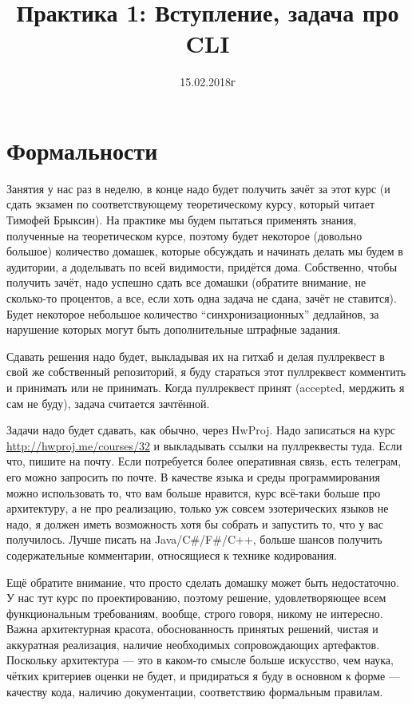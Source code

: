 \documentclass[a5paper]{article}
\title{Практика 1: Вступление, задача про CLI}
\date{15.02.2018г}
\begin{document}
\maketitle
\thispagestyle{empty}

\section{Формальности}
Занятия у нас раз в неделю, в конце надо будет получить зачёт за этот курс (и сдать экзамен по соответствующему теоретическому курсу, который читает Тимофей Брыксин). На практике мы будем пытаться применять знания, полученные на теоретическом курсе, поэтому будет некоторое (довольно большое) количество домашек, которые обсуждать и начинать делать мы будем в аудитории, а доделывать по всей видимости, придётся дома. Собственно, чтобы получить зачёт, надо успешно сдать все домашки (обратите внимание, не сколько-то процентов, а все, если хоть одна задача не сдана, зачёт не ставится). Будет некоторое небольшое количество ``синхронизационных'' дедлайнов, за нарушение которых могут быть дополнительные штрафные задания.

Сдавать решения надо будет, выкладывая их на гитхаб и делая пуллреквест в свой же собственный репозиторий, я буду стараться этот пуллреквест комментить и принимать или не принимать. Когда пуллреквест принят (accepted, мерджить я сам не буду), задача считается зачтённой.

Задачи надо будет сдавать, как обычно, через HwProj. Надо записаться на курс \url{http://hwproj.me/courses/32} и выкладывать ссылки на пуллреквесты туда. Если что, пишите на почту. Если потребуется более оперативная связь, есть телеграм, его можно запросить по почте. В качестве языка и среды программирования можно использовать то, что вам больше нравится, курс всё-таки больше про архитектуру, а не про реализацию, только уж совсем эзотерических языков не надо, я должен иметь возможность хотя бы собрать и запустить то, что у вас получилось. Лучше писать на Java/C\#/F\#/C++, больше шансов получить содержательные комментарии, относящиеся к технике кодирования.

Ещё обратите внимание, что просто сделать домашку может быть недостаточно. У нас тут курс по проектированию, поэтому решение, удовлетворяющее всем функциональным требованиям, вообще, строго говоря, никому не интересно. Важна архитектурная красота, обоснованность принятых решений, чистая и аккуратная реализация, наличие необходимых сопровождающих артефактов. Поскольку архитектура --- это в каком-то смысле больше искусство, чем наука, чётких критериев оценки не будет, и придираться я буду в основном к форме --- качеству кода, наличию документации, соответствию формальным правилам. 
\end{document}
